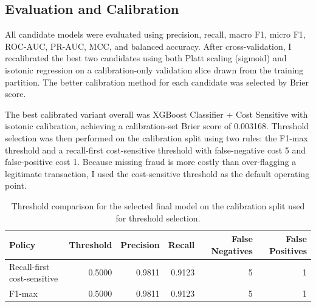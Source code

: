 \begin{table}[htbp]
  \centering
  \caption{Top Question 2 cross-validation results.}
  \label{tab:q2-cv}
\end{table}

\subsection{Evaluation and Calibration}

All candidate models were evaluated using precision, recall, macro F1, micro F1, ROC-AUC, PR-AUC, MCC, and balanced accuracy. After cross-validation, I recalibrated the best two candidates using both Platt scaling (sigmoid) and isotonic regression on a calibration-only validation slice drawn from the training partition. The better calibration method for each candidate was selected by Brier score.

The best calibrated variant overall was XGBoost Classifier + Cost Sensitive with isotonic calibration, achieving a calibration-set Brier score of 0.003168. Threshold selection was then performed on the calibration split using two rules: the F1-max threshold and a recall-first cost-sensitive threshold with false-negative cost 5 and false-positive cost 1. Because missing fraud is more costly than over-flagging a legitimate transaction, I used the cost-sensitive threshold as the default operating point.

\begin{table}[htbp]
  \centering
  \caption{Threshold comparison for the selected final model on the calibration split used for threshold selection.}
  \label{tab:q2-thresholds}
  \begin{tabular}{lrrrrr}
    \toprule
    Policy & Threshold & Precision & Recall & False Negatives & False Positives \\
    \midrule
    Recall-first cost-sensitive & 0.5000 & 0.9811 & 0.9123 & 5 & 1 \\
    F1-max & 0.5000 & 0.9811 & 0.9123 & 5 & 1 \\
    \bottomrule
  \end{tabular}
\end{table}

